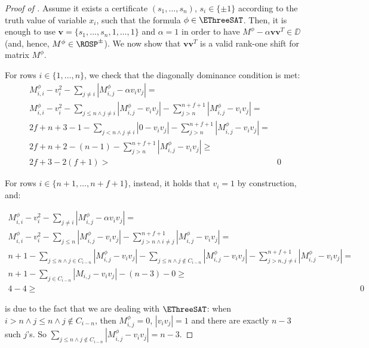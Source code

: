 \begin{proof}[Proof of ]
	Assume it exists a certificate $(s_1, \dots, s_n)$, $s_i\in\{\pm 1\}$ according to the truth value of variable $x_i$, such that the formula $\phi\in\EThreeSAT$. Then, it is enough to use $\mathbf{v}=\{s_1, \dots, s_n, 1, \dots, 1\}$ and $\alpha = 1$ in order to have $M^\phi - \alpha \mathbf{vv}^T\in\DD$ (and, hence, $M^\phi\in\ROSP^\pm$). We now show that $\mathbf{vv}^T$ is a valid rank-one shift for matrix $M^\phi$.
	
	For rows $i\in\{1, \dots, n\}$, we check that the diagonally dominance condition is met:
	\begin{align}
		M^\phi_{i,i} - v_i^2 - \sum_{j \neq i} |M^\phi_{i,j}  - \alpha v_i v_j| = & \\
		M^\phi_{i,i} - v_i^2 - \sum_{j \leq n\land j\neq i}|M^\phi_{i,j} - v_i v_j |  - \sum_{j>n}^{n+f+1} |M^\phi_{i,j} - v_i v_j| = & \\
		2f + n + 3 - 1 - \sum_{j<n \land j\neq i}|0 - v_i v_j |  - \sum_{j>n}^{n+f+1} |M^\phi_{i,j} - v_i v_j| = & \\
		2f + n + 2 - (n-1)  - \sum_{j>n}^{n+f+1} |M^\phi_{i,j} - v_i v_j| \geq \\
		2f + 3  - 2(f+1) > & 0
	\end{align}
	
	For rows $i\in\{n+1, \dots, n+f+1\}$, instead, it holds that $v_i=1$ by construction, and:
	
	\begin{align}
		M^\phi_{i,i} - v_i^2 - \sum_{j \neq i} |M^\phi_{i,j}  - \alpha v_i v_j| = & \\
		M^\phi_{i,i} - v_i^2 - \sum_{j\leq n}|M^\phi_{i,j} - v_i v_j |  - \sum_{j>n \land i\neq j}^{n+f+1} |M^\phi_{i,j} - v_i v_j| = & \\
		n+ 1 - \sum_{j\leq n \land j\in C_{i-n}} |M^\phi_{i,j} - v_i v_j| - \sum_{j \leq n \land j\notin  C_{i-n}} |M^\phi_{i,j} - v_i v_j| - \sum_{j>n, j\neq i}^{n+f+1} |M^\phi_{i,j} - v_i v_j| = & \\
		n + 1 -  \sum_{j\in C_{i-n}} |M_{i,j} - v_i v_j| - (n-3) - 0 \geq & \label{eq:exactly_n_min_3_vars_notin_clause} \\ 
		4 - 4 \geq & 0 \label{eq:at_least_one_true_in_every_clause}
	\end{align}
	
	 is due to the fact that we are dealing with $\EThreeSAT$: when $i>n \land j\leq n \land j \notin C_{i-n}$, then $M^\phi_{i,j}=0$, $|v_i v_j| = 1$ and there are exactly $n-3$ such $j$'s. So $\sum_{j \leq n \land j\notin  C_{i-n}} |M^\phi_{i,j} - v_i v_j| = n- 3$.
	

\end{proof}
